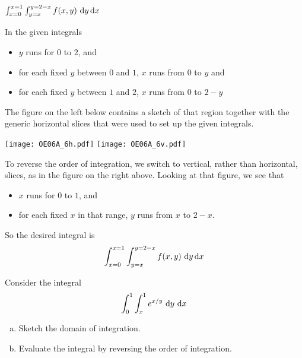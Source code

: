 %

\begin{answer}
$\int_{x=0}^{x=1}\int_{y=x}^{y=2-x} f(x,y)\ \dee{y}\,\dee{x}$
\end{answer}

\begin{solution}
In the given integrals
\begin{itemize}
\item
$y$ runs for $0$ to $2$, and

\item
for each fixed $y$ between $0$ and $1$, $x$ runs from $0$ to $y$
and


\item
for each fixed $y$ between $1$ and $2$, $x$ runs from $0$ to $2-y$
\end{itemize}
The figure on the left below contains a sketch of that region together
with the generic horizontal slices that were used to set up the given
integrals.
\begin{center}
     \texttt{[image: OE06A\_6h.pdf]}\qquad
     \texttt{[image: OE06A\_6v.pdf]}
\end{center}
To reverse the order of integration, we switch to vertical, rather
than horizontal, slices, as in the figure on the right above.
Looking at that figure, we see that 
\begin{itemize}
\item
$x$ runs for $0$ to $1$, and

\item
for each fixed $x$ in that range, $y$ runs from $x$ to $2-x$.
\end{itemize}
So the desired integral is
\begin{align*}
\int_{x=0}^{x=1}\int_{y=x}^{y=2-x} f(x,y)\ \mathrm{d}y\,\mathrm{d}x
\end{align*}
\end{solution}

\begin{question}[M200 2004A] %
Consider the integral
\begin{equation*}
\int_0^1\int_x^1 e^{x/y}\ \mathrm{d}y\ \mathrm{d}x
\end{equation*}
\begin{enumerate}[(a)]
\item
Sketch the domain of integration.
\item
Evaluate the integral by reversing the order of integration.
\end{enumerate}
\end{question}

